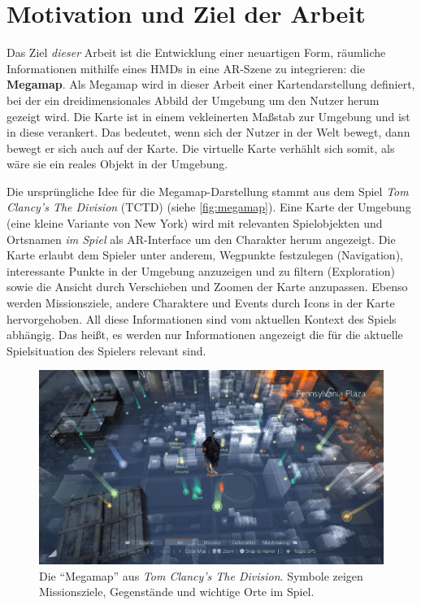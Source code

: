 \section{Motivation und Ziel der Arbeit}
\label{sec:motivation_ziel}
Das Ziel \emph{dieser} Arbeit ist die Entwicklung einer neuartigen Form, räumliche Informationen mithilfe eines HMDs in eine AR-Szene zu integrieren: die \textbf{Megamap}.
Als Megamap wird in dieser Arbeit einer Kartendarstellung definiert, bei der ein dreidimensionales Abbild der Umgebung um den Nutzer herum gezeigt wird.
Die Karte ist in einem vekleinerten Maßstab zur Umgebung und ist in diese verankert.
Das bedeutet, wenn sich der Nutzer in der Welt bewegt, dann bewegt er sich auch auf der Karte.
Die virtuelle Karte verhählt sich somit, als wäre sie ein reales Objekt in der Umgebung.

Die ursprüngliche Idee für die Megamap-Darstellung stammt aus dem Spiel \emph{Tom Clancy's The Division} (TCTD) \parencite{Ubisoft2018} (siehe \autoref{fig:megamap}).
Eine Karte der Umgebung (eine kleine Variante von New York) wird mit relevanten Spielobjekten und Ortsnamen \emph{im Spiel} als AR-Interface um den Charakter herum angezeigt.
Die Karte erlaubt dem Spieler unter anderem, Wegpunkte festzulegen (Navigation), interessante Punkte in der Umgebung anzuzeigen und zu filtern (Exploration) sowie die Ansicht durch Verschieben und Zoomen der Karte anzupassen.
Ebenso werden Missionsziele, andere Charaktere und Events durch Icons in der Karte hervorgehoben.
All diese Informationen sind vom aktuellen Kontext des Spiels abhängig.
Das heißt, es werden nur Informationen angezeigt die für die aktuelle Spielsituation des Spielers relevant sind.
\begin{figure}[t]
    \centering
    \includegraphics[width=\textwidth]{figures/the_division_megamap.jpg}
    \caption{Die \enquote{Megamap} aus \emph{Tom Clancy's The Division}. Symbole zeigen Missionsziele, Gegenstände und wichtige Orte im Spiel. }
    \label{fig:megamap}
\end{figure}

